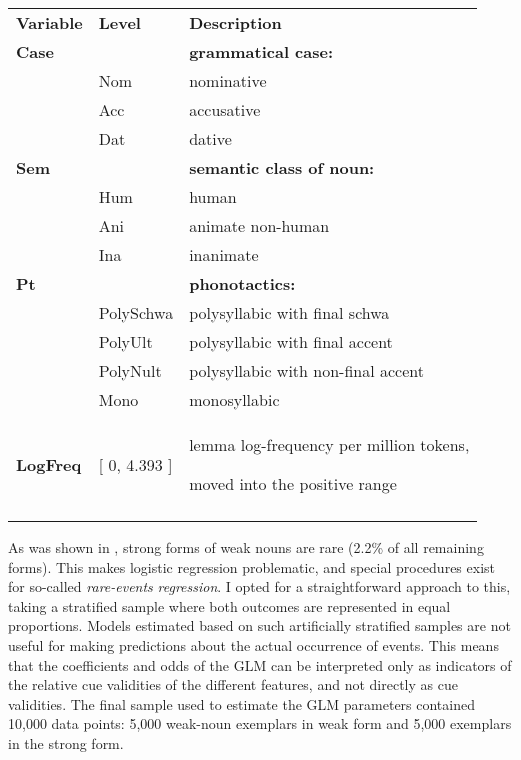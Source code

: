 \tabletail{}
\tablelasttail{}
\begin{tabularx}{\textwidth}{XXX}
\lsptoprule

{\bfseries Variable} & {\bfseries Level} & {\bfseries Description}\\
{\bfseries Case} &  & {\bfseries grammatical case:}\\
& Nom & nominative\\
& Acc & accusative\\
& Dat & dative\\
{\bfseries Sem} &  & {\bfseries semantic class of noun:}\\
& Hum & human\\
& Ani & animate non-human\\
& Ina & inanimate\\
{\bfseries Pt} &  & {\bfseries phonotactics:}\\
& PolySchwa & polysyllabic with final schwa\\
& PolyUlt & polysyllabic with final accent\\
& PolyNult & polysyllabic with non-final accent\\
& Mono & monosyllabic\\
{\bfseries LogFreq} & [ 0, 4.393 ] & lemma log-frequency per million tokens,

moved into the positive range\\
\lspbottomrule
\end{tabularx}
\begin{styleMoutonText}
As was shown in , strong forms of weak nouns are rare (2.2\% of all remaining forms). This makes logistic regression problematic, and special procedures exist for so-called \textit{rare-events} \textit{regression}. I opted for a straightforward approach to this, taking a stratified sample where both outcomes are represented in equal proportions. Models estimated based on such artificially stratified samples are not useful for making predictions about the actual occurrence of events. This means that the coefficients and odds of the GLM can be interpreted only as indicators of the relative cue validities of the different features, and not directly as cue validities. The final sample used to estimate the GLM parameters contained 10,000 data points: 5,000 weak-noun exemplars in weak form and 5,000 exemplars in the strong form.
\end{styleMoutonText}

